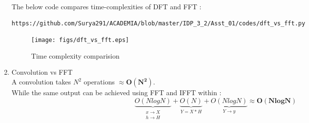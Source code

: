 \documentclass[journal,12pt,twocolumn]{IEEEtran}
\renewcommand\thesection{\arabic{section}}
\begin{document}
\begin{enumerate}[label=\thesection.\arabic*.,ref=\thesection.\theenumi]
The below code compares time-complexities of DFT and FFT  :\begin{lstlisting}
https://github.com/Surya291/ACADEMIA/blob/master/IDP_3_2/Asst_01/codes/dft_vs_fft.py
\end{lstlisting}
 
 \begin{figure}[!ht]
	\texttt{[image: figs/dft\_vs\_fft.eps]}
	\caption{Time complexity comparision}
\end{figure}

\item Convolution vs FFT\\
A convolution takes $ N^{2}$ operations $\approx \boldsymbol{O(N^{2})}$.\\
While the same output can be achieved using FFT and IFFT within : 
\begin{equation}
   \underbrace{O(NlogN)}_{\substack{\text{$x \rightarrow X$} \\ {\text{$h \rightarrow H $}}  }} + 
   \underbrace{O(N)}_{\text{$Y = X*H$}} + 
   \underbrace{O(NlogN)}_{\text{$Y \rightarrow y$}} \approx \boldsymbol{O(NlogN)}
\end{equation}

\end{enumerate}
\end{document}
